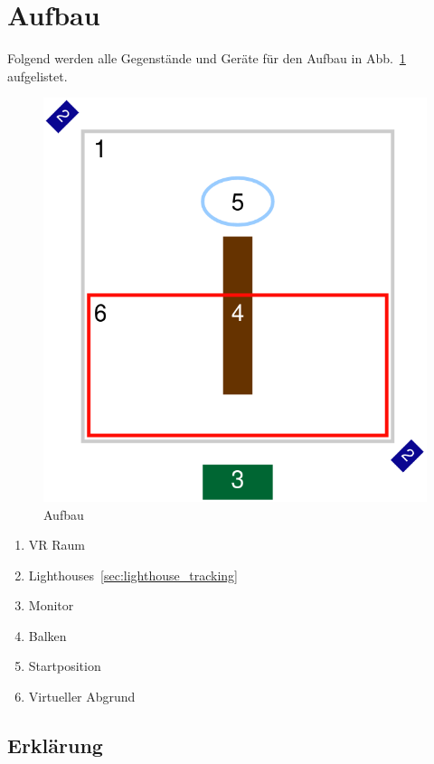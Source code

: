 
\section{Aufbau}
\label{sec:assembly}

Folgend werden alle Gegenstände und Geräte für den Aufbau in Abb.~\ref{fig:assembly} aufgelistet.

\begin{figure}
    \centering
    \includegraphics[scale=0.5]{pics/assemlbly}
    \caption{Aufbau}
    \label{fig:assembly}
\end{figure}

\begin{enumerate}
    \item VR Raum
    \item Lighthouses~\ref{sec:lighthouse_tracking}
    \item Monitor
    \item Balken
    \item Startposition
    \item Virtueller Abgrund
\end{enumerate}

\subsection{Erklärung}\label{subsec:description}

